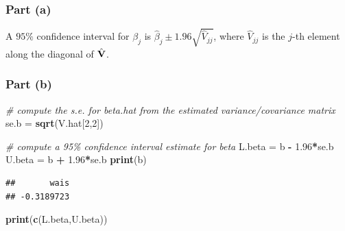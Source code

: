 \documentclass[
  11pt,
]{article}
\newenvironment{Shaded}{\begin{snugshade}}{\end{snugshade}}
\newcommand{\CommentTok}[1]{\textcolor[rgb]{0.56,0.35,0.01}{\textit{#1}}}
\newcommand{\DecValTok}[1]{\textcolor[rgb]{0.00,0.00,0.81}{#1}}
\newcommand{\FloatTok}[1]{\textcolor[rgb]{0.00,0.00,0.81}{#1}}
\newcommand{\FunctionTok}[1]{\textcolor[rgb]{0.13,0.29,0.53}{\textbf{#1}}}
\newcommand{\NormalTok}[1]{#1}
\newcommand{\OtherTok}[1]{\textcolor[rgb]{0.56,0.35,0.01}{#1}}
\newcommand{\SpecialCharTok}[1]{\textcolor[rgb]{0.81,0.36,0.00}{\textbf{#1}}}
\begin{document}
\hypertarget{part-a-1}{%
\subsubsection{Part (a)}\label{part-a-1}}


A \(95\%\) confidence interval for \(\beta_j\) is
\(\hat{\beta}_j \pm 1.96 \sqrt{\hat{V}_{j j}}\), where \(\hat{V}_{j j}\)
is the \(j\)-th element along the diagonal of \(\hat{\mathbf{V}}\).

\hypertarget{part-b-1}{%
\subsubsection{Part (b)}\label{part-b-1}}


\begin{Shaded}
\begin{Highlighting}[]
\CommentTok{\# compute the s.e. for beta.hat from the estimated variance/covariance matrix}
\NormalTok{se.b }\OtherTok{=} \FunctionTok{sqrt}\NormalTok{(V.hat[}\DecValTok{2}\NormalTok{,}\DecValTok{2}\NormalTok{])}

\CommentTok{\# compute a 95\% confidence interval estimate for beta}
\NormalTok{L.beta }\OtherTok{=}\NormalTok{ b }\SpecialCharTok{{-}} \FloatTok{1.96}\SpecialCharTok{*}\NormalTok{se.b}
\NormalTok{U.beta }\OtherTok{=}\NormalTok{ b }\SpecialCharTok{+} \FloatTok{1.96}\SpecialCharTok{*}\NormalTok{se.b}
\FunctionTok{print}\NormalTok{(b)}
\end{Highlighting}
\end{Shaded}

\begin{verbatim}
##       wais 
## -0.3189723
\end{verbatim}

\begin{Shaded}
\begin{Highlighting}[]
\FunctionTok{print}\NormalTok{(}\FunctionTok{c}\NormalTok{(L.beta,U.beta))}
\end{Highlighting}
\end{Shaded}
\end{document}
